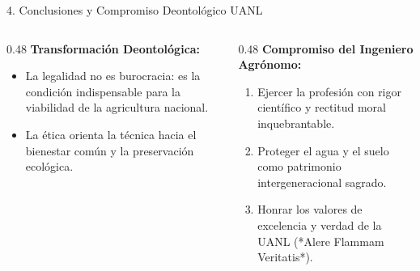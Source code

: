 \documentclass[
  spanish,
  aspectratio=169,
  xcolor={dvipsnames,table}
]{beamer}
\begin{document}
\begin{frame}{4. Conclusiones y Compromiso Deontológico UANL}
  \begin{columns}[T]
    \begin{column}{0.48\textwidth}
      \textbf{\color{uanlblue}Transformación Deontológica:}
      \begin{itemize}
        \item La legalidad no es burocracia: es la condición indispensable para la viabilidad de la agricultura nacional.
        \item La ética orienta la técnica hacia el bienestar común y la preservación ecológica.
      \end{itemize}
    \end{column}
    \begin{column}{0.48\textwidth}
      \textbf{\color{uanlblue}Compromiso del Ingeniero Agrónomo:}
      \begin{enumerate}
        \item Ejercer la profesión con rigor científico y rectitud moral inquebrantable.
        \item Proteger el agua y el suelo como patrimonio intergeneracional sagrado.
        \item Honrar los valores de excelencia y verdad de la UANL (*Alere Flammam Veritatis*).
      \end{enumerate}
    \end{column}
  \end{columns}
\end{frame}
\end{document}
